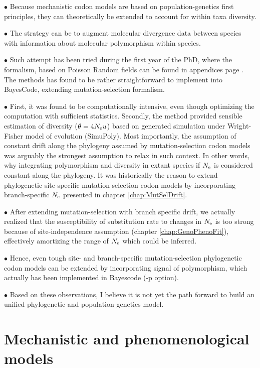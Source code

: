 $\bullet$ Because mechanistic codon models are based on population-genetics first principles, they can theoretically be extended to account for within taxa diversity.

$\bullet$ The strategy can be to augment molecular divergence data between species with information about molecular polymorphism within species.

$\bullet$ Such attempt has been tried during the first year of the PhD, where the formalism, based on Poisson Random fields can be found in appendices page \pageref{sec-appendix:PRF}.
The methods has found to be rather straightforward to implement into BayesCode, extending mutation-selection formalism.

$\bullet$ First, it was found to be computationally intensive, even though optimizing the computation with sufficient statistics.
Secondly, the method provided sensible estimation of diversity ($\theta = 4 N_{\textrm{e}} u$) based on generated simulation under Wright-Fisher model of evolution (SimuPoly).
Most importantly, the assumption of constant drift along the phylogeny assumed by mutation-selection codon models was arguably the strongest assumption to relax in such context.
In other words, why integrating polymorphism and diversity in extant species if $N_{\textrm{e}}$ is considered constant along the phylogeny.
It was historically the reason to extend phylogenetic site-specific mutation-selection codon models by incorporating branch-specific $N_{\textrm{e}}$ presented in chapter \ref{chap:MutSelDrift}.

$\bullet$ After extending mutation-selection with branch specific drift, we actually realized that the susceptibility of substitution rate to changes in $N_{\textrm{e}}$ is too strong because of site-independence assumption (chapter \ref{chap:GenoPhenoFit}), effectively amortizing the range of $N_{\textrm{e}}$ which could be inferred.

$\bullet$ Hence, even tough site- and branch-specific mutation-selection phylogenetic codon models can be extended by incorporating signal of polymorphism, which actually has been implemented in Bayescode (-p option).

$\bullet$ Based on these observations, I believe it is not yet the path forward to build an unified phylogenetic and population-genetics model.

\section{Mechanistic and phenomenological models}
\label{sec:mechanistic-and-phenomenological-models}

